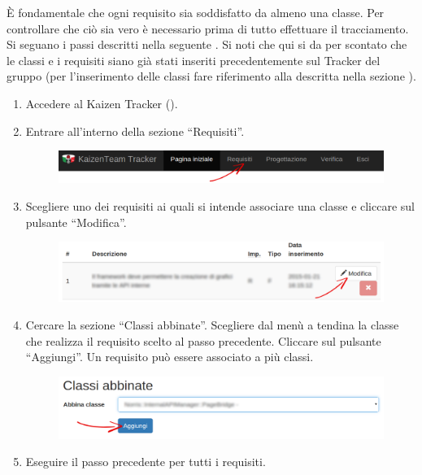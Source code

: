 				 \label{sec:ProgTracClasReq}
					È fondamentale che ogni requisito sia soddisfatto da almeno una classe. Per controllare che ciò sia vero è necessario prima di tutto effettuare il tracciamento. Si seguano i passi descritti nella seguente . Si noti che qui si da per scontato che le classi e i requisiti siano già stati inseriti precedentemente sul Tracker del gruppo (per l'inserimento delle classi fare riferimento alla  descritta nella sezione ).
					\begin{enumerate}
						\item Accedere al Kaizen  Tracker ().
						\item Entrare all'interno della sezione “Requisiti”.
						\begin{figure}[H]
							\centering
							\includegraphics[width=\textwidth]{Pics/HomePageMenuFrecciaReq}
						\end{figure}
						\item Scegliere uno dei requisiti ai quali si intende associare una classe e cliccare sul pulsante “Modifica”.
						\begin{figure}[H]
							\centering
							\includegraphics[width=\textwidth]{Pics/VistaRequisitoFrecciaModifica}
						\end{figure}
						\item Cercare la sezione “Classi abbinate”. Scegliere dal menù a tendina la classe che realizza il requisito scelto al passo precedente. Cliccare sul pulsante “Aggiungi”. Un requisito  può essere associato a più classi.
						\begin{figure}[H]
							\centering
							\includegraphics[width=\textwidth]{Pics/AbbinareClasseRequisito}
						\end{figure}
						\item Eseguire il passo precedente per tutti i requisiti.
					\end{enumerate}
